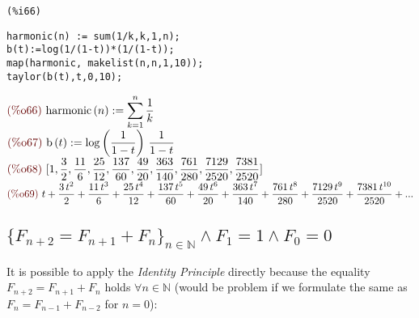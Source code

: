 \noindent
\begin{minipage}[t]{8ex}{\color{red}\bf
\begin{verbatim}
(%i66) 
\end{verbatim}}
\end{minipage}
\begin{minipage}[t]{\textwidth}{\color{blue}
\begin{verbatim}
harmonic(n) := sum(1/k,k,1,n);
b(t):=log(1/(1-t))*(1/(1-t));
map(harmonic, makelist(n,n,1,10));
taylor(b(t),t,0,10);
\end{verbatim}}
\end{minipage}
\begin{math}\displaystyle
\parbox{8ex}{\color{labelcolor}(\%o66) }
\mathrm{harmonic}\left( n\right) :=\sum_{k=1}^{n}\frac{1}{k}
\end{math}\\
\begin{math}\displaystyle
\parbox{8ex}{\color{labelcolor}(\%o67) }
\mathrm{b}\left( t\right) :=\mathrm{log}\left( \frac{1}{1-t}\right)
\,\frac{1}{1-t}
\end{math}\\
\begin{math}\displaystyle
\parbox{8ex}{\color{labelcolor}(\%o68) }
[1,\frac{3}{2},\frac{11}{6},\frac{25}{12},\frac{137}{60},\frac{49}{20},\frac{363}{140},\frac{761}{280},\frac{7129}{2520},\frac{7381}{2520}]
\end{math}\\
\begin{math}\displaystyle
\parbox{8ex}{\color{labelcolor}(\%o69) }
t+\frac{3\,{t}^{2}}{2}+\frac{11\,{t}^{3}}{6}+\frac{25\,{t}^{4}}{12}+\frac{137\,{t}^{5}}{60}+\frac{49\,{t}^{6}}{20}+\frac{363\,{t}^{7}}{140}+\frac{761\,{t}^{8}}{280}+\frac{7129\,{t}^{9}}{2520}+\frac{7381\,{t}^{10}}{2520}+...
\end{math}

\subsection{$\{F_{n+2} = F_{n+1} + F_{n} \}_{n\in \mathbb{N}} \wedge
  F_1 = 1 \wedge F_0 = 0 $}

It is possible to apply the \emph{Identity Principle} directly because
the equality $F_{n+2} = F_{n+1} + F_{n} $ holds $\forall n \in
\mathbb{N} $ (would be problem if we formulate the same as $F_{n} =
F_{n-1} + F_{n-2} $ for $n=0$):


